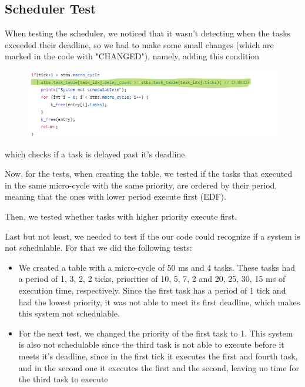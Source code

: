 \documentclass[a4paper,12pt]{article}
\begin{document}
\subsection{Scheduler Test}
When testing the scheduler, we noticed that it wasn't detecting when the tasks exceeded their deadline, so we had to make some small changes (which are marked in the code with "CHANGED"), namely, adding this condition
\begin{figure}[H]
    \centering
    \includegraphics[width=0.91\linewidth]{code_change.png}
    \label{fig:gantt}
\end{figure}

which checks if a task is delayed past it's deadline.

Now, for the tests, when creating the table, we tested if the tasks that executed in the same micro-cycle with the same priority, are ordered by their period, meaning that the ones with lower period execute first (EDF).

Then, we tested whether tasks with higher priority execute first.

Last but not least, we needed to test if the our code could recognize if a system is not schedulable. For that we did the following tests:
\begin{itemize}
    \item We created a table with a micro-cycle of 50 ms and 4 tasks. These tasks had a period of 1, 3, 2, 2 ticks, priorities of 10, 5, 7, 2 and 20, 25, 30, 15 ms of execution time, respectively. Since the first task has a period of 1 tick and had the lowest priority, it was not able to meet its first deadline, which makes this system not schedulable.

    \item For the next test, we changed the priority of the first task to 1. This system is also not schedulable since the third task is not able to execute before it meets it's deadline, since in the first tick it executes the first and fourth task, and in the second one it executes the first and the second, leaving no time for the third task to execute


\end{itemize}
\end{document}

